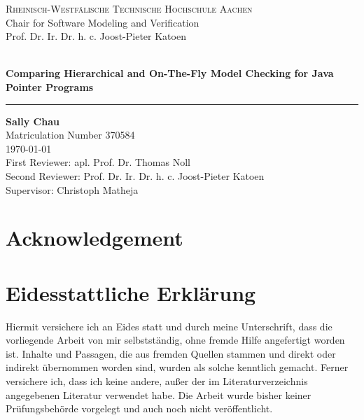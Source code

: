 \documentclass[a4paper, 12pt, twoside]{report}
\newcommand*\ruleline[1]{\par\noindent\raisebox{.8ex}{\makebox[\linewidth]{\hrulefill\hspace{1ex}\raisebox{-.8ex}{#1}\hspace{1ex}\hrulefill}}}
\begin{document}
	
	\begin{titlepage}
		\centering
		{\large \scshape Rheinisch-Westfälische Technische Hochschule Aachen}\\
		{\large
			Chair for Software Modeling and Verification\\
			Prof. Dr. Ir. Dr. h. c. Joost-Pieter Katoen\\}
		\vspace*{\fill}
		{\large \ruleline{Master Thesis}}\\
		\vspace{1cm}
		\textbf{\Huge Comparing Hierarchical and On-The-Fly Model Checking for Java Pointer Programs}\\
		\vspace{1cm}
		\hrule
		\vspace{1cm}
		{\Large \textbf{Sally Chau} \\}
		\vspace{0.25cm}
		{\large Matriculation Number 370584} \\
		{\large \today}\\
		\vspace{3cm}
		{\large First Reviewer: apl. Prof. Dr. Thomas Noll \\ Second Reviewer: Prof. Dr. Ir. Dr. h. c. Joost-Pieter Katoen \\ Supervisor: Christoph Matheja} \\ 
		\vspace{1cm}
		\vspace*{\fill}
	\end{titlepage}
	
	\pagestyle{empty}
	
	\clearpage\mbox{}\clearpage
	
	\chapter*{Acknowledgement} 
	
	
	\clearpage\mbox{}\clearpage
	
	\chapter*{Eidesstattliche Erklärung}
	
	Hiermit versichere ich an Eides statt und durch meine Unterschrift, dass die vorliegende Arbeit von mir selbstständig, ohne fremde Hilfe angefertigt worden ist. Inhalte und Passagen, die aus fremden Quellen stammen und direkt oder indirekt übernommen worden sind, wurden als solche kenntlich gemacht. Ferner versichere ich, dass ich keine andere, außer der im Literaturverzeichnis angegebenen Literatur verwendet habe. Die Arbeit wurde bisher keiner Prüfungsbehörde vorgelegt und auch noch nicht veröffentlicht.
	\vspace{20 mm}
	
\end{document}
